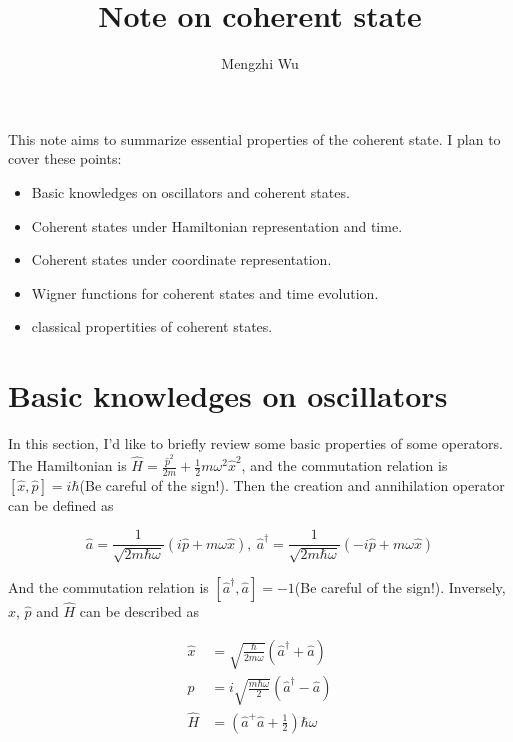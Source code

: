 \documentclass{article}
\title{Note on coherent state}
\author{Mengzhi Wu}
\begin{document}
    \maketitle

    This note aims to summarize essential properties of the coherent state. I plan to cover these points:

    \begin{itemize}
        \item Basic knowledges on oscillators and coherent states.
        \item Coherent states under Hamiltonian representation and time.
        \item Coherent states under coordinate representation.
        \item Wigner functions for coherent states and time evolution.
        \item classical propertities of coherent states.
    \end{itemize}

    \section{Basic knowledges on oscillators}
        In this section, I'd like to briefly review some basic properties of some operators. The Hamiltonian is $\hat{H}=\frac{\hat{p}^2}{2m}+\frac{1}{2}m\omega^2\hat{x}^2$, and the commutation relation is $[\hat{x},\hat{p}]=i\hbar$(Be careful of the sign!). Then the creation and annihilation operator can be defined as 

        \begin{equation}
            \hat{a}= \frac{1}{\sqrt{2m\hbar\omega}}(i\hat{p}+m\omega\hat{x}), \ \hat{a}^\dagger=\frac{1}{\sqrt{2m\hbar\omega}}(-i\hat{p}+m\omega\hat{x})
        \end{equation}

        And the commutation relation is $[\hat{a}^\dagger, \hat{a}]=-1$(Be careful of the sign!). Inversely, $\hat{x}$, $\hat{p}$ and $\hat{H}$ can be described as 

        \begin{equation}
            \begin{split}
                \hat{x}&= \sqrt{\frac{\hbar}{2m\omega}}(\hat{a}^\dagger+\hat{a}) \\
                \hat{p}&= i\sqrt{\frac{m\hbar\omega}{2}}(\hat{a}^\dagger-\hat{a}) \\
                \hat{H}&= (\hat{a}^+\hat{a}+\frac{1}{2})\hbar\omega
            \end{split}
        \end{equation}
\end{document}
